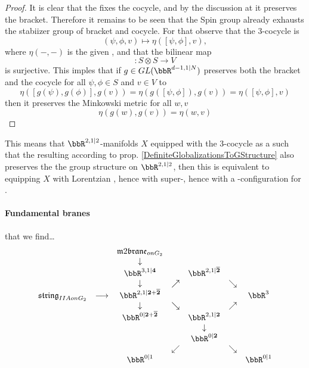 \begin{proof}
It is clear that the  fixes the cocycle, and by the discussion at  it preserves the bracket. Therefore it remains to be seen that the Spin group already exhausts the stabiizer group of bracket and cocycle. For that observe that the 3-cocycle is
\begin{displaymath}
(\psi,\phi, v) \mapsto \eta( [\psi,\phi], v )
,
\end{displaymath}
where $\eta(-,-)$ is the given , and that the bilinear map
\begin{displaymath}
[-,-]\colon S \otimes S\to V
\end{displaymath}
is surjective. This imples that if $g \in GL(\bbR^{d-1,1|N})$ preserves both the bracket and the cocycle for all $\psi, \phi \in S$ and $v \in V$ to
\begin{displaymath}
\eta( [g(\psi),g(\phi)], g(v) )
=
\eta( g([\psi,\phi]), g(v) )
=
\eta( [\psi,\phi], v )
\end{displaymath}
then it preserves the Minkowski metric for all $w,v$
\begin{displaymath}
\eta(g(w), g(v)) = \eta(w,v)
\end{displaymath}
\end{proof}
This means that $\bbR^{2,1|2}$-manifolds $X$ equipped with the 3-cocycle as a  such that the resulting  according to prop. \ref{DefiniteGlobalizationsToGStructure} also preserves the the group structure on $\bbR^{2,1|2}$, then this is equivalent to equipping $X$ with Lorentzian , hence with super-, hence with a -configuration for .
\hypertarget{fundamental_branes}{}\paragraph*{{Fundamental branes}}\label{fundamental_branes}
 that we find\ldots{}
\begin{displaymath}
\itexarray{
&& \mathfrak{m}2\mathfrak{brane}_{onG_2}
\\
&& \downarrow
\\
&& \bbR^{3,1|\mathbf{4}}  &&  \bbR^{2,1|\overline{\mathbf{2}}}
\\
&& \downarrow & \nearrow&  & \searrow
\\
\mathfrak{string}_{IIAonG_2} &\longrightarrow& \bbR^{2,1|\mathbf{2}+\overline{\mathbf{2}}} &&  && \bbR^{3}
\\
&& \downarrow &\searrow&  & \nearrow
\\
&& \bbR^{0|\mathbf{2}+\overline{\mathbf{2}}} &&  \bbR^{2,1|\mathbf{2}}
\\
&& && \downarrow
\\
&& && \bbR^{0|\mathbf{2}}
\\
&& & \swarrow && \searrow
\\
&& \bbR^{0|1} && && \bbR^{0|1}
}
\end{displaymath}
